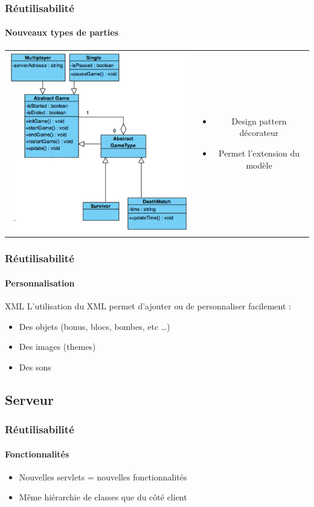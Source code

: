 	\begin{frame}
	\frametitle{Réutilisabilité}
	\framesubtitle{Nouveaux types de parties}

	
	\begin{tabular}{cc}
	\begin{minipage}{5cm}
		\includegraphics[scale=0.4]{img/decorateur.png} 
	\end{minipage}
	&
	\begin{minipage}{5cm}
	\begin{itemize} 
		\item Design pattern décorateur
		\item Permet l'extension du modèle
	\end{itemize} 
	\end{minipage}
	\end{tabular}
	
	\end{frame}
	

	\begin{frame}
	\frametitle{Réutilisabilité}
	\framesubtitle{Personnalisation}
	
		XML
			L'utilisation du XML permet d'ajouter ou de personnaliser facilement :
			\begin{itemize}
				\item Des objets (bonus, blocs, bombes, etc \ldots)
				\item Des images (themes)
				\item Des sons
			\end{itemize}
	\end{frame}
	

\subsection{Serveur}

	\begin{frame}
	\frametitle{Réutilisabilité}
	\framesubtitle{Fonctionnalités}
	
		\begin{itemize}
			\item Nouvelles servlets = nouvelles fonctionnalités
			\item Même hiérarchie de classes que du côté client 
		\end{itemize}
		
	\end{frame}